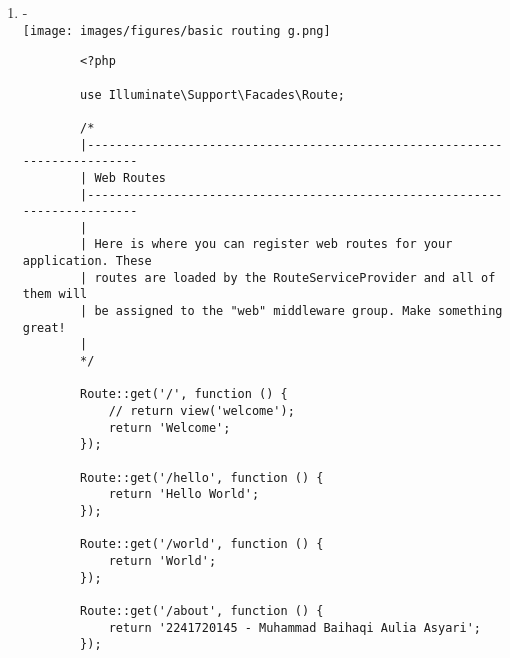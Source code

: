 \documentclass[12pt,titlepage]{article}
\begin{document}
\begin{enumerate}[label=\alph*.]
\begin{verbatim}
        use Illuminate\Support\Facades\Route;
        
        /*
        |--------------------------------------------------------------------------
        | Web Routes
        |--------------------------------------------------------------------------
        |
        | Here is where you can register web routes for your application. These
        | routes are loaded by the RouteServiceProvider and all of them will
        | be assigned to the "web" middleware group. Make something great!
        |
        */
        
        Route::get('/', function () {
            // return view('welcome');
            return 'Welcome';
        });
        
        Route::get('/hello', function () {
            return 'Hello World';
        });
        
        Route::get('/world', function () {
            return 'World';
        });
    \end{verbatim}
    \item - \\ \texttt{[image: images/figures/basic routing g.png]}
    \begin{verbatim}
        <?php

        use Illuminate\Support\Facades\Route;
        
        /*
        |--------------------------------------------------------------------------
        | Web Routes
        |--------------------------------------------------------------------------
        |
        | Here is where you can register web routes for your application. These
        | routes are loaded by the RouteServiceProvider and all of them will
        | be assigned to the "web" middleware group. Make something great!
        |
        */
        
        Route::get('/', function () {
            // return view('welcome');
            return 'Welcome';
        });
        
        Route::get('/hello', function () {
            return 'Hello World';
        });
        
        Route::get('/world', function () {
            return 'World';
        }); 
        
        Route::get('/about', function () {
            return '2241720145 - Muhammad Baihaqi Aulia Asyari';
        });
    \end{verbatim}
\end{enumerate}
\end{document}
